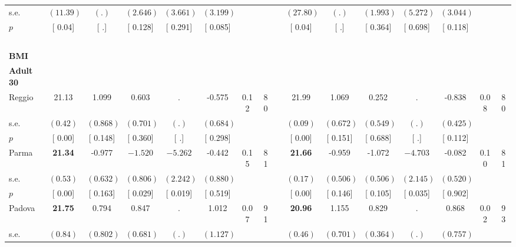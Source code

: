 \begin{longtable}{L{8em} c c c c c c c p{1em} c c c c c c c}
\quad \quad \quad \quad s.e.& $ (    11.39)$ & $ (        .)$ & $ (    2.646)$ & $ (    3.661)$ & $ (    3.199)$ & & & & $ (    27.80)$ & $ (        .)$ & $ (    1.993)$ & $ (    5.272)$ & $ (    3.044)$ & &  \\*
\quad \quad \quad \quad $ p$ & [     0.04] & [        .] & [    0.128] & [    0.291] & [    0.085] & & & & [     0.04] & [        .] & [    0.364] & [    0.698] & [    0.118] & &  \\[1em]
~\\[1em]
\textbf{BMI} \\*
\quad \quad \textbf{Adult 30} & & & & & & & & & & & & & & & \\* 
\quad \quad \quad Reggio& 21.13 &     1.099 &     0.603 &         . &    -0.575 &      0.12 &        80 & & 21.99 &     1.069 &     0.252 &         . &    -0.838 &      0.08 &        80  \\*
\quad \quad \quad \quad s.e.& $ (     0.42)$ & $ (    0.868)$ & $ (    0.701)$ & $ (        .)$ & $ (    0.684)$ & & & & $ (     0.09)$ & $ (    0.672)$ & $ (    0.549)$ & $ (        .)$ & $ (    0.425)$ & &  \\*
\quad \quad \quad \quad $ p$ & [     0.00] & [    0.148] & [    0.360] & [        .] & [    0.298] & & & & [     0.00] & [    0.151] & [    0.688] & [        .] & [    0.112] & &  \\[1em]
\quad \quad \quad Parma& \textbf{    21.34} &    -0.977 & $ \mathbf{   -1.520}$ & $ \mathbf{   -5.262}$ &    -0.442 &      0.15 &        81 & & \textbf{    21.66} &    -0.959 &    -1.072 & $ \mathbf{   -4.703}$ &    -0.082 &      0.10 &        81  \\*
\quad \quad \quad \quad s.e.& $ (     0.53)$ & $ (    0.632)$ & $ (    0.806)$ & $ (    2.242)$ & $ (    0.880)$ & & & & $ (     0.17)$ & $ (    0.506)$ & $ (    0.506)$ & $ (    2.145)$ & $ (    0.520)$ & &  \\*
\quad \quad \quad \quad $ p$ & [     0.00] & [    0.163] & [    0.029] & [    0.019] & [    0.519] & & & & [     0.00] & [    0.146] & [    0.105] & [    0.035] & [    0.902] & &  \\[1em]
\quad \quad \quad Padova& \textbf{    21.75} &     0.794 &     0.847 &         . &     1.012 &      0.07 &        91 & & \textbf{    20.96} &     1.155 &     0.829 &         . &     0.868 &      0.02 &        93  \\*
\quad \quad \quad \quad s.e.& $ (     0.84)$ & $ (    0.802)$ & $ (    0.681)$ & $ (        .)$ & $ (    1.127)$ & & & & $ (     0.46)$ & $ (    0.701)$ & $ (    0.364)$ & $ (        .)$ & $ (    0.757)$ & &  \\*

\end{longtable}
